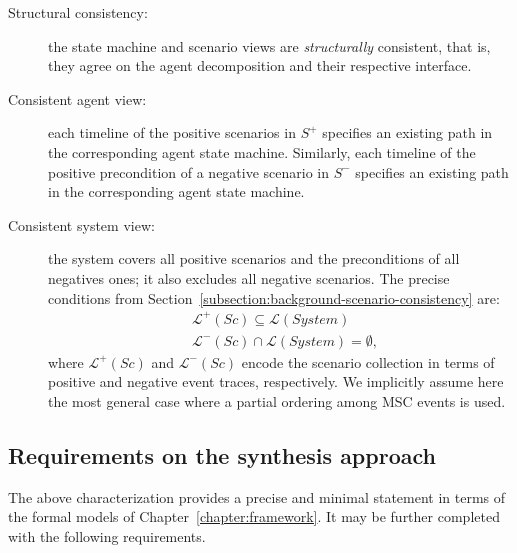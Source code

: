 \begin{description}
\item[Structural consistency:] the state machine and scenario views are \emph{structurally} consistent, that is, they agree on the agent decomposition and their respective interface.

\item[Consistent agent view:] each timeline of the positive scenarios in $S^+$ specifies an existing path in the corresponding agent state machine. Similarly, each timeline of the positive precondition of a negative scenario in $S^-$ specifies an existing path in the corresponding agent state machine. 

\item[Consistent system view:] the system covers all positive scenarios and the preconditions of all negatives ones; it also excludes all negative scenarios. The precise conditions from Section~\ref{subsection:background-scenario-consistency} are:
\begin{align}
&\mathcal{L}^+(Sc) \subseteq \mathcal{L}(System)         \label{relation:inductive-statement-positive}\\
&\mathcal{L}^-(Sc) \cap \mathcal{L}(System) = \emptyset, \label{relation:inductive-statement-negative}
\end{align}
where $\mathcal{L}^+(Sc)$ and $\mathcal{L}^-(Sc)$ encode the scenario collection in terms of positive and negative event traces, respectively. We implicitly assume here the most general case where a partial ordering among MSC events is used.

\end{description}


\subsection{Requirements on the synthesis approach\label{subsection:inductive-synthesis-requirements}}

The above characterization provides a precise and minimal statement in terms of the formal models of Chapter~\ref{chapter:framework}. It may be further completed with the following requirements.

